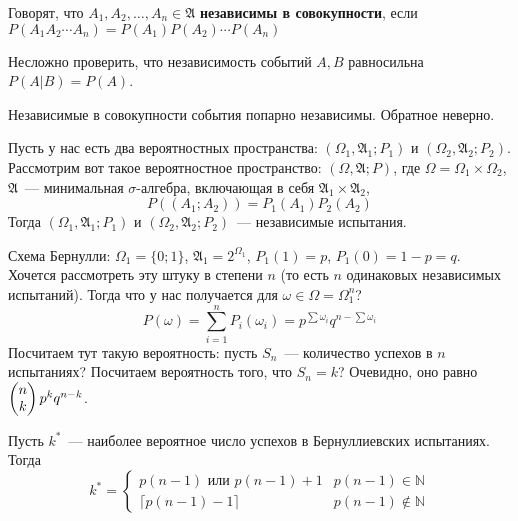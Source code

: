 \documentclass{article}
\newcommand{\A}{{\mathfrak A}}
\begin{document}
    \begin{definition}
        Говорят, что $A_1,A_2,\ldots,A_n\in\A$ \textbf{независимы в совокупности}, если
        $P(A_1A_2\cdots A_n)=P(A_1)P(A_2)\cdots P(A_n)$
    \end{definition}
    \begin{property}
        Несложно проверить, что независимость событий $A,B$ равносильна $P(A|B)=P(A)$.
    \end{property}
    \begin{property}
        Независимые в совокупности события попарно независимы. Обратное неверно.
    \end{property}
    \begin{definition}
        Пусть у нас есть два вероятностных пространства: $(\Omega_1,\A_1;P_1)$ и $(\Omega_2,\A_2;P_2)$. Рассмотрим вот такое вероятностное пространство: $(\Omega,\A;P)$, где $\Omega=\Omega_1\times\Omega_2$, $\A$~--- минимальная $\sigma$-алгебра, включающая в себя $\A_1\times\A_2$,
        $$
        P((A_1;A_2))=P_1(A_1)P_2(A_2)
        $$
        Тогда $(\Omega_1,\A_1;P_1)$ и $(\Omega_2,\A_2;P_2)$~--- независимые испытания.
    \end{definition}
    \begin{example}
        Схема Бернулли: $\Omega_1=\{0;1\}$, $\A_1=2^{\Omega_1}$, $P_1(1)=p$, $P_1(0)=1-p=q$. Хочется рассмотреть эту штуку в степени $n$ (то есть $n$ одинаковых независимых испытаний). Тогда что у нас получается для $\omega\in\Omega=\Omega_1^n$?
        $$
        P(\omega)=\sum\limits_{i=1}^nP_i(\omega_i)=p^{\sum\omega_i}q^{n-\sum\omega_i}
        $$
        Посчитаем тут такую вероятность: пусть $S_n$~--- количество успехов в $n$ испытаниях? Посчитаем вероятность того, что $S_n=k$? Очевидно, оно равно $\left(\begin{matrix}n\\k\end{matrix}\right)p^kq^{n-k}$.
    \end{example}
    \begin{claim}
        Пусть $k^*$~--- наиболее вероятное число успехов в Бернуллиевских испытаниях. Тогда
        $$
        k^*=\begin{cases}
            p(n-1)\text{ или }p(n-1)+1 & p(n-1)\in\mathbb N\\
            \lceil p(n-1)-1\rceil & p(n-1)\notin\mathbb N
        \end{cases}
        $$
    \end{claim}
\end{document}
